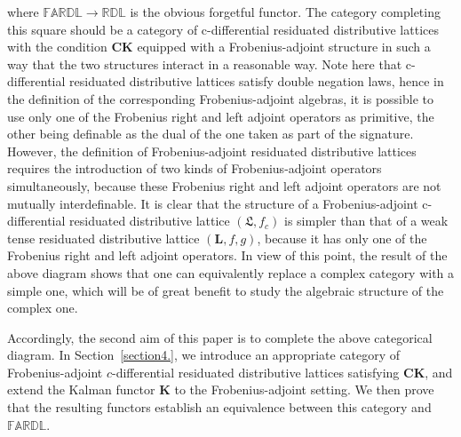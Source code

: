 \documentclass[final,12pt,times]{elsarticle}
\theoremstyle{plain}
\theoremstyle{definition}
\theoremstyle{break}
\begin{document}
where $\mathbb{FARDL}\rightarrow \mathbb{RDL}$ is the obvious forgetful functor. The category completing this square should be a category of c-differential residuated distributive lattices with the condition $\mathbf{CK}$ equipped with a Frobenius-adjoint  structure in such a way that the two structures interact in a reasonable way. Note here that c-differential residuated distributive lattices satisfy double negation laws, hence in the definition of the corresponding Frobenius-adjoint algebras, it is possible to use only one of the Frobenius right and left adjoint operators as primitive, the other being definable as the dual of the one taken as part of the signature. However, the definition of Frobenius-adjoint residuated distributive lattices requires the introduction of two kinds of Frobenius-adjoint operators simultaneously, because these Frobenius right and left adjoint operators are not mutually interdefinable. It is clear that the structure of a Frobenius-adjoint c-differential residuated distributive lattice $(\boldsymbol{\mathfrak{L}},f_c)$ is simpler than that of a weak tense residuated distributive lattice $(\mathbf{L},f,g)$, because it has only one of the Frobenius right and left adjoint operators. In view of this point, the result of the above diagram shows that one can equivalently replace a complex category with a simple one, which will be of great benefit to study the algebraic structure of the complex one. 

Accordingly, the second aim of this paper is to complete the above categorical diagram. In Section~\ref{section4.}, we introduce an appropriate category of Frobenius-adjoint $c$-differential residuated distributive lattices satisfying $\mathbf{CK}$, and extend the Kalman functor $\mathbf{K}$ to the Frobenius-adjoint setting. We then prove that the resulting functors establish an equivalence between this category and $\mathbb{FARDL}$.
\end{document}
